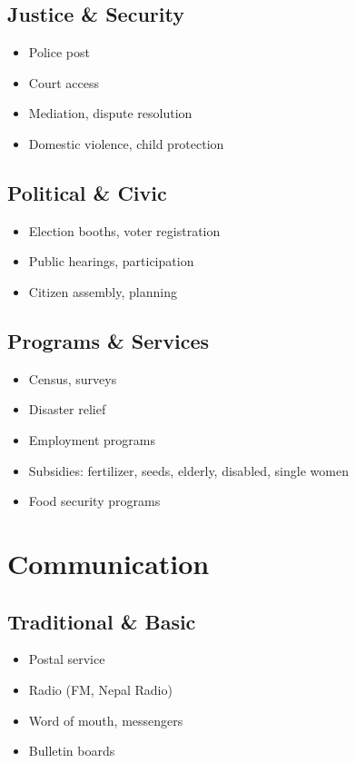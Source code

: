\documentclass[11pt,a4paper]{article}
\begin{document}
\subsection{Justice \& Security}
\begin{itemize}
    \item Police post
    \item Court access
    \item Mediation, dispute resolution
    \item Domestic violence, child protection
\end{itemize}

\subsection{Political \& Civic}
\begin{itemize}
    \item Election booths, voter registration
    \item Public hearings, participation
    \item Citizen assembly, planning
\end{itemize}

\subsection{Programs \& Services}
\begin{itemize}
    \item Census, surveys
    \item Disaster relief
    \item Employment programs
    \item Subsidies: fertilizer, seeds, elderly, disabled, single women
    \item Food security programs
\end{itemize}

\section{Communication}

\subsection{Traditional \& Basic}
\begin{itemize}
    \item Postal service
    \item Radio (FM, Nepal Radio)
    \item Word of mouth, messengers
    \item Bulletin boards
\end{itemize}
\end{document}

